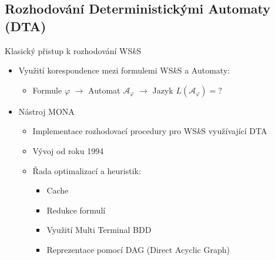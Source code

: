 \documentclass{beamer}
\begin{document}
	\subsection{Rozhodování Deterministickými Automaty (DTA)}
	\begin{frame}{Klasický přistup k rozhodování WS$k$S}
  \begin{itemize}
	 \item Využití korespondence mezi formulemi WS$k$S a Automaty:
	\begin{itemize}
	 \item Formule $\varphi$ \pause $\rightarrow$ Automat $\mathcal{A}_\varphi$  \pause $\rightarrow$ Jazyk $L(\mathcal{A}_\varphi) = ?$
	 \end{itemize}
	\pause
	\bigskip
	\item Nástroj \textsc{MONA}
	\begin{itemize}
	 \item Implementace rozhodovací procedury pro WS$k$S využívající DTA
	 \item Vývoj od roku 1994
	\pause
	 \item Řada optimalizací a heuristik:
	 \begin{itemize}
	\pause
	  \item Cache
	\pause
		\item Redukce formulí
	\pause
		\item Využití Multi Terminal BDD
	\pause
		\item Reprezentace pomocí DAG (Direct Acyclic Graph)
	 \end{itemize}
	\end{itemize}
	\end{itemize}
	\end{frame}
  
\end{document}
